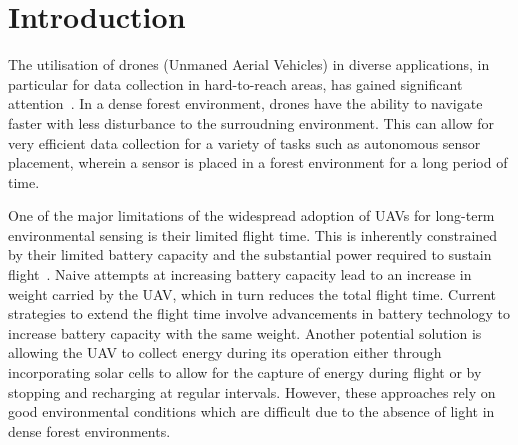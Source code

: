 \chapter{Introduction}

The utilisation of drones (Unmaned Aerial Vehicles) in diverse applications, in particular for data collection in hard-to-reach areas, has gained significant attention~\cite{droneReview}.
In a dense forest environment, drones have the ability to navigate faster with less disturbance to the surroudning environment.
This can allow for very efficient data collection for a variety of tasks \cite{environmentalSensing} such as autonomous sensor placement, wherein a sensor is placed in a forest environment for a long period of time.

One of the major limitations of the widespread adoption of UAVs for long-term environmental sensing is their limited flight time.
This is inherently constrained by their limited battery capacity and the substantial power required to sustain flight~\cite{droneBattery}.
Naive attempts at increasing battery capacity lead to an increase in weight carried by the UAV, which in turn reduces the total flight time.
Current strategies to extend the flight time involve advancements in battery technology to increase battery capacity with the same weight.
Another potential solution is allowing the UAV to collect energy during its operation either through incorporating solar cells to allow for the capture of energy during flight \cite{droneSunlight} or by stopping and recharging at regular intervals.
However, these approaches rely on good environmental conditions which are difficult due to the absence of light in dense forest environments.

